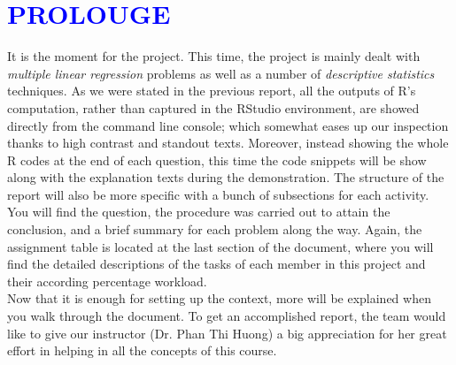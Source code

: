 \documentclass[a4paper]{article}
\begin{document}
\section*{\textcolor{blue}{PROLOUGE}}
\noindent
It is the moment for the project. This time, the project is mainly dealt with \textit{multiple linear regression} problems as well as a number of \textit{descriptive statistics} techniques. As we were stated in the previous report, all the outputs of R’s computation, rather than captured in the RStudio environment, are showed directly from the command line console; which somewhat eases up our inspection thanks to high contrast and standout texts. Moreover, instead showing the whole R codes at the end of each question, this time the code snippets will be show  along with the explanation texts during the demonstration. The structure of the report will also be more specific with a bunch of subsections for each activity. You will find the question, the procedure was carried out to attain the conclusion, and a brief summary for each problem along the way. Again, the assignment table is located at the last section of the document, where you will find the detailed descriptions of the tasks of each member in this project and their according percentage workload. \\ \newline
Now that it is enough for setting up the context, more will be explained 
when you walk through the document. To get an accomplished report, the team would like to give our instructor (Dr. Phan Thi Huong) a big appreciation for her great effort in helping in all the concepts of this course.



\vspace{3cm}
\end{document}

